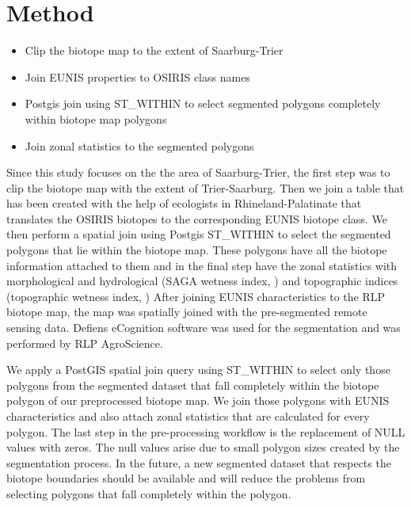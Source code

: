 \documentclass[authoryear, review,12pt,number]{elsarticle}
\begin{document}
\section{Method}

\begin{itemize}
    \item Clip the biotope map to the extent of Saarburg-Trier
    \item Join EUNIS properties to OSIRIS class names
    \item Postgis join using ST\_WITHIN to select segmented polygons completely
        within biotope map polygons
    \item Join zonal statistics to the segmented polygons
\end{itemize}

Since this study focuses on the the area of Saarburg-Trier, the first step was
to clip the biotope map with the extent of Trier-Saarburg. Then we join a table
that has been created with the help of ecologists in Rhineland-Palatinate that
translates the OSIRIS biotopes to the corresponding EUNIS biotope class. We then
perform a spatial join using Postgis ST\_WITHIN to select the segmented polygons
that lie within the biotope map. These polygons have all the biotope information
attached to them and in the final step have the zonal statistics with
morphological and hydrological (SAGA wetness index, ) and topographic indices 
(topographic wetness
index, )
After joining EUNIS characteristics to the RLP biotope map, the map was 
spatially joined with the pre-segmented remote sensing data. Defiens eCognition
software was used for the segmentation and was performed by RLP AgroScience. 


We apply a PostGIS spatial join query using ST\_WITHIN to select only those
polygons from the segmented dataset that fall completely within the biotope
polygon of our preprocessed biotope map. We join those polygons
with EUNIS characteristics and also attach zonal statistics that are calculated
for every polygon. The last step in the pre-processing workflow is the
replacement of NULL values with zeros. The null values arise due to small
polygon sizes created by the segmentation process. In the future, a new
segmented dataset that respects the biotope boundaries should be available and
will reduce the problems from selecting polygons that fall completely within the
polygon.
\end{document}
